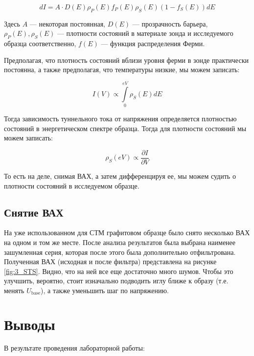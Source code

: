 \documentclass[a4paper, 12pt]{article}
\begin{document}
	\begin{equation}
		dI = A \cdot D(E) \rho_P (E) f_P(E) \rho_S(E)(1 - f_S(E)) dE
	\end{equation}
	
	Здесь $A$ --- некоторая постоянная, $D(E)$ --- прозрачность барьера, $\rho_P(E), \rho_S(E)$ --- плотности состояний в материале зонда и исследуемого образца соответственно, $f(E)$ --- функция распределения Ферми.
	
	Предполагая, что плотность состояний вблизи уровня ферми в зонде практически постоянна, а также предполагая, что температуры низкие, мы можем записать:
	
	\begin{equation}
		I(V) \propto \int\limits_0^{eV} \rho_S(E)dE 
	\end{equation} 
	
	Тогда зависимость туннельного тока от напряжения определяется плотностью состояний в энергетическом спектре образца. Тогда для плотности состояний мы можем записать:
	
	\begin{equation}
		\rho_S(eV) \propto \frac{\partial I}{\partial V}
	\end{equation}
	
	То есть на деле, снимая ВАХ, а затем дифференцируя ее, мы можем судить о плотности состояний в исследуемом образце.
	
	\subsection{Снятие ВАХ}
	
	На уже использованном для СТМ графитовом образце было снято несколько ВАХ на одном и том же месте. После анализа результатов была выбрана наименее зашумленная серия, которая после этого была дополнительно отфильтрована. Полученная ВАХ (исходная и после фильтра) представлена на рисунке \ref{fig:3_STS}. Видно, что на ней все еще достаточно много шумов. Чтобы это улучшить, вероятно, стоит изначально подводить иглу ближе к образу (т.е. менять $U_{\text{base}}$), а также уменьшить шаг по напряжению.
	
	\section{Выводы}
	
	В результате проведения лабораторной работы:
	
\end{document}
